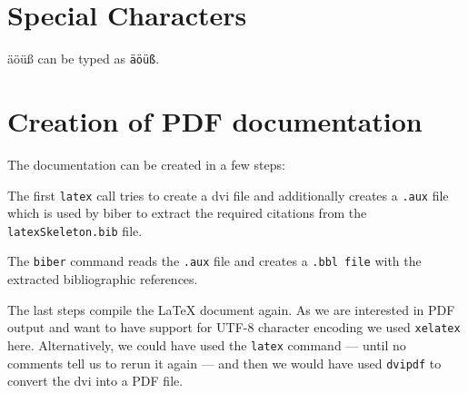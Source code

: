 \documentclass[a4paper]{article}
\begin{document}
\section{Special Characters}

äöüß can be typed as \verb?äöüß?.

\section{Creation of PDF documentation}

The documentation can be created in a few steps:


The first \texttt{latex} call tries to create a dvi file and additionally creates a \texttt{.aux} file which is used by biber to
extract the required citations from the \texttt{latexSkeleton.bib} file.

The \texttt{biber} command reads the \texttt{.aux} file and creates a \texttt{.bbl file} with the extracted bibliographic references.

The last steps compile the \LaTeX{} document again. As we are interested in PDF output and want to have support for UTF-8 character encoding we used \texttt{xelatex} here.
Alternatively, we could have used the \texttt{latex} command --- until no comments tell us to rerun it again --- and then we would have used \texttt{dvipdf} to convert the dvi
into a PDF file.

\appendix
\printbibliography
\end{document}
